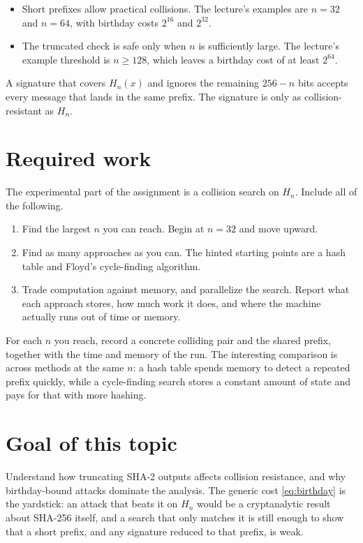 \documentclass[11pt,a4paper]{article}
\newcommand{\Hn}{H_{n}}
\begin{document}
\begin{itemize}
  \item Short prefixes allow practical collisions.
        The lecture's examples are \(n = 32\) and \(n = 64\),
        with birthday costs \(2^{16}\) and \(2^{32}\).
  \item The truncated check is safe only when \(n\) is sufficiently large.
        The lecture's example threshold is \(n \ge 128\),
        which leaves a birthday cost of at least \(2^{64}\).
\end{itemize}

A signature that covers \(\Hn(x)\) and ignores the remaining
\(256 - n\) bits accepts every message that lands in the same prefix.
The signature is only as collision-resistant as \(\Hn\).

\section{Required work}

The experimental part of the assignment is a collision search on
\(\Hn\). Include all of the following.

\begin{enumerate}
  \item Find the largest \(n\) you can reach.
        Begin at \(n = 32\) and move upward.
  \item Find as many approaches as you can.
        The hinted starting points are a hash table and Floyd's
        cycle-finding algorithm.
  \item Trade computation against memory, and parallelize the search.
        Report what each approach stores, how much work it does, and
        where the machine actually runs out of time or memory.
\end{enumerate}

For each \(n\) you reach, record a concrete colliding pair and the shared
prefix, together with the time and memory of the run.
The interesting comparison is across methods at the same \(n\):
a hash table spends memory to detect a repeated prefix quickly,
while a cycle-finding search stores a constant amount of state and
pays for that with more hashing.

\section{Goal of this topic}

Understand how truncating SHA-2 outputs affects collision resistance,
and why birthday-bound attacks dominate the analysis.
The generic cost \eqref{eq:birthday} is the yardstick:
an attack that beats it on \(\Hn\) would be a cryptanalytic result about
SHA-256 itself, and a search that only matches it is still enough to show
that a short prefix, and any signature reduced to that prefix, is weak.
\end{document}
